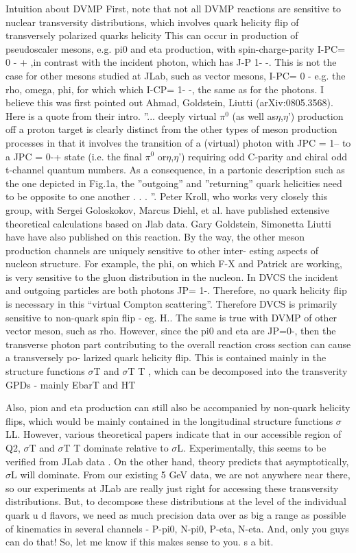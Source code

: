 Intuition about DVMP
First, note that not all DVMP reactions are sensitive to nuclear transversity distributions,
which involves quark helicity flip of transversely polarized quarks helicity This can occur
in production of pseudoscaler mesons, e.g. pi0 and eta production, with spin-charge-parity
I-PC= 0 - + ,in contrast with the incident photon, which has J-P 1- -. This is not the case
for other mesons studied at JLab, such as vector mesons, I-PC= 0 - e.g. the rho, omega, phi,
for which which I-CP= 1- -, the same as for the photons. I believe this was first pointed out
Ahmad, Goldstein, Liutti (arXiv:0805.3568). Here is a quote from their intro. ”... deeply
virtual $\pi^0$ (as well as$\eta$,$\eta$') production off a proton target is clearly distinct from the other
types of meson production processes in that it involves the transition of a (virtual) photon
with JPC = 1– to a JPC = 0-+ state (i.e. the final $\pi^0$ or$\eta$,$\eta$’) requiring odd C-parity and
chiral odd t-channel quantum numbers. As a consequence, in a partonic description such
as the one depicted in Fig.1a, the ”outgoing” and ”returning” quark helicities need to be
opposite to one another . . . ”.
Peter Kroll, who works very closely this group, with Sergei Goloskokov, Marcus Diehl,
et al. have published extensive theoretical calculations based on Jlab data. Gary Goldstein,
Simonetta Liutti have have also published on this reaction.
By the way, the other meson production channels are uniquely sensitive to other inter-
esting aspects of nucleon structure. For example, the phi, on which F-X and Patrick are
working, is very sensitive to the gluon distribution in the nucleon.
In DVCS the incident and outgoing particles are both photons JP= 1-. Therefore, no
quark helicity flip is necessary in this “virtual Compton scattering”. Therefore DVCS is
primarily sensitive to non-quark spin flip - eg. H.. The same is true with DVMP of other
vector meson, such as rho. However, since the pi0 and eta are JP=0-, then the transverse
photon part contributing to the overall reaction cross section can cause a transversely po-
larized quark helicity flip. This is contained mainly in the structure functions $\sigma$T and $\sigma$T T ,
which can be decomposed into the transverity GPDs - mainly EbarT and HT

Also, pion and eta production can still also be accompanied by non-quark helicity flips,
which would be mainly contained in the longitudinal structure functions $\sigma$LL. However,
various theoretical papers indicate that in our accessible region of Q2, $\sigma$T and $\sigma$T T dominate
relative to $\sigma$L. Experimentally, this seems to be verified from JLab data . On the other
hand, theory predicts that asymptotically, $\sigma$L will dominate. From our existing 5 GeV data,
we are not anywhere near there, so our experiments at JLab are really just right for accessing
these transversity distributions. But, to decompose these distributions at the level of the
individual quark u d flavors, we need as much precision data over as big a range as possible
of kinematics in several channels - P-pi0, N-pi0, P-eta, N-eta. And, only you guys can do
that! So, let me know if this makes sense to you. s a bit.

